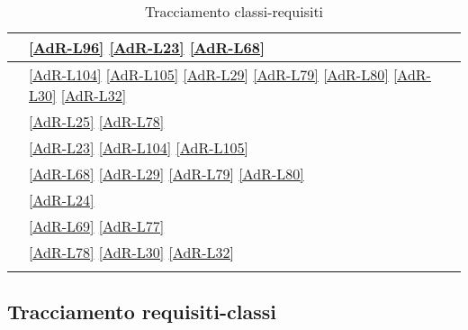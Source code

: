 \begin{longtable}{|m{12cm}|>{\centering}m{2cm}|}
	\hline \coderef{BubbleAndEat::Restaurant::OrderGateway::Handlers::CustomerHandler} & \ref{AdR-L96} \linebreak \ref{AdR-L23} \linebreak \ref{AdR-L68} \tabularnewline
	\hline \coderef{BubbleAndEat::Restaurant::OrderGateway::Handlers::ManagerHandler} & \ref{AdR-L104} \linebreak \ref{AdR-L105} \linebreak \ref{AdR-L29} \linebreak \ref{AdR-L79} \linebreak \ref{AdR-L80} \linebreak \ref{AdR-L30} \linebreak \ref{AdR-L32} \tabularnewline
	\hline \coderef{BubbleAndEat::Restaurant::OrderGateway::Handlers::ChefHandler} & \ref{AdR-L25} \linebreak \ref{AdR-L78} \tabularnewline
	\hline \coderef{BubbleAndEat::Restaurant::OrderGateway::Menu} & \ref{AdR-L23} \linebreak \ref{AdR-L104} \linebreak \ref{AdR-L105} \tabularnewline
	\hline \coderef{BubbleAndEat::Restaurant::OrderGateway::MenuItem} & \ref{AdR-L68} \linebreak \ref{AdR-L29} \linebreak \ref{AdR-L79} \linebreak \ref{AdR-L80} \tabularnewline
	\hline \coderef{BubbleAndEat::Restaurant::OrderGateway::Orders::Order} & \ref{AdR-L24} \tabularnewline
	\hline \coderef{BubbleAndEat::Restaurant::OrderGateway::Orders::OrderItem} & \ref{AdR-L69} \linebreak \ref{AdR-L77} \tabularnewline
	\hline \coderef{BubbleAndEat::Restaurant::OrderGateway::Orders::OrderContainer} & \ref{AdR-L78} \linebreak \ref{AdR-L30} \linebreak \ref{AdR-L32} \tabularnewline
	
	\hline
	\caption{Tracciamento classi-requisiti}
\end{longtable}

\subsection{Tracciamento requisiti-classi}

